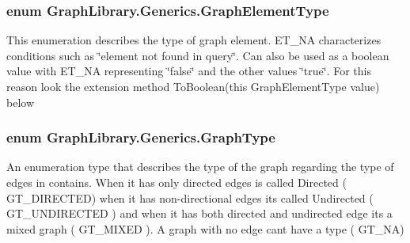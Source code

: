 \subsubsection[{Graph\+Element\+Type}]{\setlength{\rightskip}{0pt plus 5cm}enum {\bf Graph\+Library.\+Generics.\+Graph\+Element\+Type}\hspace{0.3cm}{\ttfamily [strong]}}\label{namespace_graph_library_1_1_generics_a919a165f16deccdd1b3d7e8a93423fbc}


This enumeration describes the type of graph element. E\+T\+\_\+\+N\+A characterizes conditions such as \char`\"{}element not found in query\char`\"{}. Can also be used as a boolean value with E\+T\+\_\+\+N\+A representing \char`\"{}false\char`\"{} and the other values \char`\"{}true\char`\"{}. For this reason look the extension method To\+Boolean(this Graph\+Element\+Type value) below 

\hypertarget{namespace_graph_library_1_1_generics_a1bac729ea88e6f3925406df33f15d056}{}
\subsubsection[{Graph\+Type}]{\setlength{\rightskip}{0pt plus 5cm}enum {\bf Graph\+Library.\+Generics.\+Graph\+Type}\hspace{0.3cm}{\ttfamily [strong]}}\label{namespace_graph_library_1_1_generics_a1bac729ea88e6f3925406df33f15d056}


An enumeration type that describes the type of the graph regarding the type of edges in contains. When it has only directed edges is called Directed ( G\+T\+\_\+\+D\+I\+R\+E\+C\+T\+E\+D) when it has non-\/directional edges its called Undirected ( G\+T\+\_\+\+U\+N\+D\+I\+R\+E\+C\+T\+E\+D ) and when it has both directed and undirected edge its a mixed graph ( G\+T\+\_\+\+M\+I\+X\+E\+D ). A graph with no edge can\textquotesingle{}t have a type ( G\+T\+\_\+\+N\+A) 

